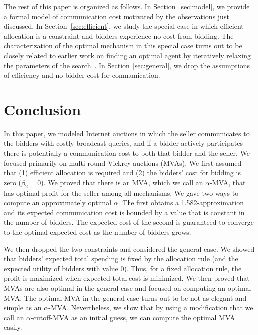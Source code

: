 \documentclass{aamas2013}
\begin{document}
The rest of this paper is organized as follows.  In
Section~\ref{sec:model}, we provide a formal model of communication cost
motivated by the observations just discussed.  In
Section~\ref{sec:efficient}, we study the special case in which efficient
allocation is a constraint and bidders experience no cost from bidding.
The characterization of the optimal mechanism in this special case turns
out to be closely related to earlier work on finding an optimal agent by
iteratively relaxing the parameters of the search~\cite{SarneSR2010:IncreasingSearch}.  In
Section~\ref{sec:general}, we drop the assumptions of efficiency and no
bidder cost for communication.















\section{Conclusion}
In this paper, we modeled Internet auctions in which the seller communicates to
the bidders with costly broadcast queries, and if a bidder actively
participates there is potentially a communication cost to both that bidder and
the seller.  We focused primarily on multi-round Vickrey auctions (MVAs).  We
first assumed that (1) efficient allocation is required and (2) the bidders'
cost for bidding is zero ($\beta_2 = 0$). We proved that there is an MVA, which
we call an $\alpha$-MVA, that has optimal profit for the seller among all
mechanisms.  We gave two ways to compute an approximately optimal $\alpha$.
The first obtains a 1.582-approximation and its expected communication cost is
bounded by a value that is constant in the number of bidders. The expected cost
of the second is guaranteed to converge to the optimal expected cost as the
number of bidders grows.

We then dropped the two constraints and considered the general case.  We showed
that bidders' expected total spending is fixed by the allocation rule (and the
expected utility of bidders with value $0$). Thus, for a fixed allocation rule,
the profit is maximized when expected total cost is minimized.  We then proved
that MVAs are also optimal in the general case and focused on computing an
optimal MVA.  The optimal MVA in the general case turns out to be not as
elegant and simple as an $\alpha$-MVA.  Nevertheless, we show that by using a
modification that we call an $\alpha$-cutoff-MVA as an initial guess, we can
compute the optimal MVA easily.



\end{document}
